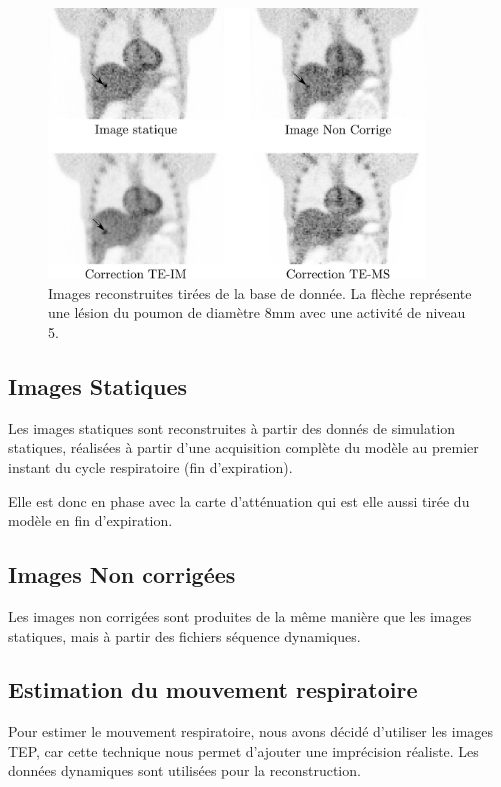 \begin{figure}
 \centering
 \includegraphics[width=10cm]{images/exempleImageRecon}
 \caption[Images reconstruites tirées de la base de donnée]{Images reconstruites tirées de la base de donnée. La flèche représente une lésion du poumon de diamètre 8mm avec une activité de niveau 5.}
 \label{fig:exempleImageRecon}
\end{figure}

\subsection{Images Statiques}

Les images statiques sont reconstruites à partir des donnés de simulation statiques, réalisées à partir d'une acquisition complète du modèle au premier instant du cycle respiratoire (fin d'expiration).

Elle est donc en phase avec la carte d'atténuation qui est elle aussi tirée du modèle en fin d'expiration.

\subsection{Images Non corrigées}

Les images non corrigées sont produites de la même manière que les images statiques, mais à partir des fichiers séquence dynamiques.

\subsection{Estimation du mouvement respiratoire}

Pour estimer le mouvement respiratoire, nous avons décidé d'utiliser les images TEP, car cette technique nous permet d'ajouter une imprécision réaliste. Les données dynamiques sont utilisées pour la reconstruction.

